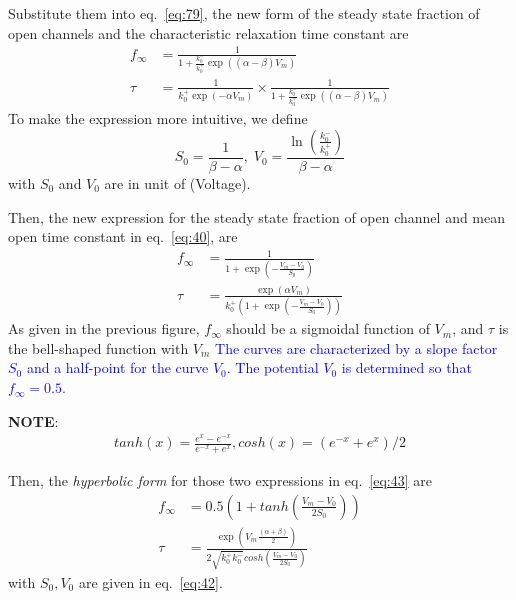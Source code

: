 Substitute them into eq.~\eqref{eq:79}, the new form of the steady
state fraction of open channels and the characteristic relaxation time
constant are
\begin{equation}
  \label{eq:40}
  \begin{split}
    f_\infty &= \frac{1}{1+\frac{k_0^-}{k_0^+}
      \exp((\alpha-\beta)V_m)} \\
    \tau &= \frac{1}{k_0^+\exp(-\alpha V_m)} \times \frac{1}{1+\frac{k_0^-}{k_0^+}\exp((\alpha-\beta)V_m)}
  \end{split}
\end{equation}
To make the expression more intuitive, we define
\begin{equation}
  \label{eq:42}
  S_0 = \frac{1}{\beta-\alpha}, \;
  V_0 = \frac{\ln (\frac{k_0^-}{k_0^+})}{\beta-\alpha}
\end{equation}
with $S_0$ and $V_0$ are in unit of (Voltage).

Then, the new expression for the steady state fraction of open channel
and mean open time constant in eq.~\eqref{eq:40}, are
\begin{equation}
  \label{eq:43}
  \begin{split}
    f_\infty &= \frac{1}{1+\exp(-\frac{V_m-V_0}{S_0})} \\
    \tau &= \frac{\exp(\alpha V_m)}{k_0^+(1+\exp(-\frac{V_m-V_0}{S_0}))}
  \end{split}
\end{equation}
As given in the previous figure, $f_\infty$ should be a sigmoidal function of
$V_m$, and $\tau$ is the bell-shaped function with $V_m$
\textcolor{blue}{The curves are characterized by a slope
  factor $S_0$ and a half-point for the curve $V_0$. The potential
  $V_0$ is determined so that $f_\infty=0.5$}.


{\bf NOTE}:
\begin{eqnarray*}
  tanh(x) = \frac{e^{x}-e^{-x}}{e^{-x}+e^{x}}, cosh(x) = (e^{-x}+e^{x})/2
\end{eqnarray*}

Then, the {\it hyperbolic form} for those two expressions in
eq.~\eqref{eq:43} are
\begin{equation}
  \label{eq:45}
  \begin{split}
    f_\infty &= 0.5 \left( 1 + tanh (\frac{V_m-V_0}{2S_0})\right) \\
    \tau &= \frac{\exp(V_m\frac{(\alpha+\beta)}{2})}{2\sqrt{k_0^+k_0^-}cosh(\frac{V_m-V_0}{2S_0})}
  \end{split}
\end{equation}
with $S_0, V_0$ are given in eq.~\ref{eq:42}.

